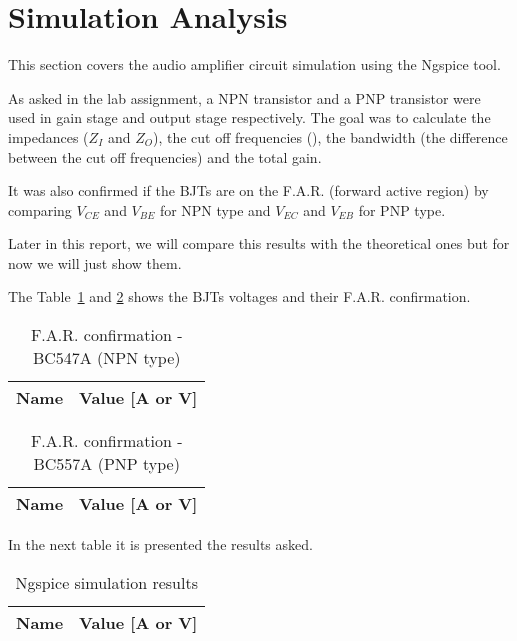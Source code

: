 \section{Simulation Analysis}
\label{sec:simulation}

\hspace{0,5cm} This section covers the audio amplifier circuit simulation using the Ngspice tool.
\par As asked in the lab assignment, a NPN transistor and a PNP transistor were used in gain stage and output stage respectively. The goal was to calculate the impedances ($Z_I$ and $Z_O$), the cut off frequencies (), the bandwidth (the difference between the cut off frequencies) and the total gain.
\par It was also confirmed if the BJTs are on the F.A.R. (forward active region) by comparing $V_{CE}$ and $V_{BE}$ for NPN type and $V_{EC}$ and $V_{EB}$ for PNP type.
\par Later in this report, we will compare this results with the theoretical ones but for now we will just show them.

\par The Table~\ref{tab:ng2} and \ref{tab:ng3} shows the BJTs voltages and their F.A.R. confirmation.

\begin{table}[!ht]
  \centering
  \begin{tabular}{|l|r|}
    \hline    
    {\bf Name} & {\bf Value [A or V]} \\ \hline
    
  \end{tabular}
  \caption{F.A.R. confirmation - BC547A (NPN type)}
  \label{tab:ng2}
\end{table}

\begin{table}[!ht]
  \centering
  \begin{tabular}{|l|r|}
    \hline    
    {\bf Name} & {\bf Value [A or V]} \\ \hline
    
  \end{tabular}
  \caption{F.A.R. confirmation - BC557A (PNP type)}
  \label{tab:ng3}
\end{table}

\par In the next table it is presented the results asked.

\begin{table}[!ht]
  \centering
  \begin{tabular}{|l|r|}
    \hline    
    {\bf Name} & {\bf Value [A or V]} \\ \hline
    
  \end{tabular}
  \caption{Ngspice simulation results}
  \label{tab:ng4}
\end{table}

